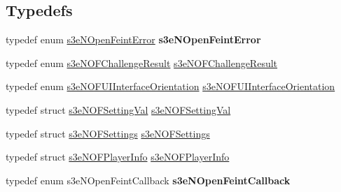 \subsection*{Typedefs}
\begin{DoxyCompactItemize}
\item 
\hypertarget{group___n_open_feint_api_group_gab401ad62bceb97c2672930ea6326f726}{
typedef enum \hyperlink{group___n_open_feint_api_group_ga6ef9ed4c26e06a1b4d5b3d0004ea28bd}{s3eNOpenFeintError} {\bfseries s3eNOpenFeintError}}
\label{group___n_open_feint_api_group_gab401ad62bceb97c2672930ea6326f726}

\item 
typedef enum \hyperlink{group___n_open_feint_api_group_ga954444cdbeafa2947e969f78ed1e29f4}{s3eNOFChallengeResult} \hyperlink{group___n_open_feint_api_group_ga72aba52b0a4382e49b79f18ea4dfebbd}{s3eNOFChallengeResult}
\item 
typedef enum \hyperlink{group___n_open_feint_api_group_gac32b01451990bbfa1b6e2fe38e01262b}{s3eNOFUIInterfaceOrientation} \hyperlink{group___n_open_feint_api_group_gaae461961f162f751c87f8ca7134f26c9}{s3eNOFUIInterfaceOrientation}
\item 
typedef struct \hyperlink{structs3e_n_o_f_setting_val}{s3eNOFSettingVal} \hyperlink{group___n_open_feint_api_group_ga2c2981f021f2a69c8ab32ab6d1a3a4d6}{s3eNOFSettingVal}
\item 
typedef struct \hyperlink{structs3e_n_o_f_settings}{s3eNOFSettings} \hyperlink{group___n_open_feint_api_group_ga0063f0a593d0853ca3d5ec8a41b3b835}{s3eNOFSettings}
\item 
typedef struct \hyperlink{structs3e_n_o_f_player_info}{s3eNOFPlayerInfo} \hyperlink{group___n_open_feint_api_group_ga56e4bc2c854fc1fb9918045fea4167ab}{s3eNOFPlayerInfo}
\item 
\hypertarget{group___n_open_feint_api_group_ga7c61dcb9e0d6e02b9b0503407c0c3c80}{
typedef enum s3eNOpenFeintCallback {\bfseries s3eNOpenFeintCallback}}
\label{group___n_open_feint_api_group_ga7c61dcb9e0d6e02b9b0503407c0c3c80}


\end{DoxyCompactItemize}
